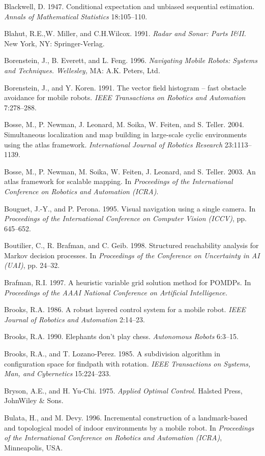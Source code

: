 \documentclass[10pt,a4paper]{article}
\begin{document}
Blackwell, D. 1947. Conditional expectation and unbiased sequential estimation.
\textit{Annals of Mathematical Statistics} 18:105–110.

Blahut, R.E.,W. Miller, and C.H.Wilcox. 1991. \textit{Radar and Sonar: Parts I\&II.} New York,
NY: Springer-Verlag.

Borenstein, J., B. Everett, and L. Feng. 1996. \textit{Navigating Mobile Robots: Systems and
Techniques. Wellesley,} MA: A.K. Peters, Ltd.

Borenstein, J., and Y. Koren. 1991. The vector field histogram – fast obstacle avoidance
for mobile robots. \textit{IEEE Transactions on Robotics and Automation} 7:278–288.

Bosse, M., P. Newman, J. Leonard, M. Soika, W. Feiten, and S. Teller. 2004. Simultaneous
localization and map building in large-scale cyclic environments using the
atlas framework. \textit{International Journal of Robotics Research} 23:1113–1139.

Bosse, M., P. Newman, M. Soika, W. Feiten, J. Leonard, and S. Teller. 2003. An atlas
framework for scalable mapping. In \textit{Proceedings of the International Conference on
Robotics and Automation (ICRA)}.

Bouguet, J.-Y., and P. Perona. 1995. Visual navigation using a single camera. In
\textit{Proceedings of the International Conference on Computer Vision (ICCV)}, pp. 645–652.

Boutilier, C., R. Brafman, and C. Geib. 1998. Structured reachability analysis for
Markov decision processes. In \textit{Proceedings of the Conference on Uncertainty in AI
(UAI)}, pp. 24–32.

Brafman, R.I. 1997. A heuristic variable grid solution method for POMDPs. In \textit{Proceedings
of the AAAI National Conference on Artificial Intelligence.}

Brooks, R.A. 1986. A robust layered control system for a mobile robot. \textit{IEEE Journal
of Robotics and Automation} 2:14–23.

Brooks, R.A. 1990. Elephants don’t play chess. \textit{Autonomous Robots} 6:3–15.

Brooks, R.A., and T. Lozano-Perez. 1985. A subdivision algorithm in configuration
space for findpath with rotation. \textit{IEEE Transactions on Systems, Man, and Cybernetics}
15:224–233.

Bryson, A.E., and H. Yu-Chi. 1975. \textit{Applied Optimal Control.} Halsted Press, JohnWiley
\& Sons.

Bulata, H., and M. Devy. 1996. Incremental construction of a landmark-based and
topological model of indoor environments by a mobile robot. In \textit{Proceedings of the
International Conference on Robotics and Automation (ICRA)}, Minneapolis, USA.
\end{document}
